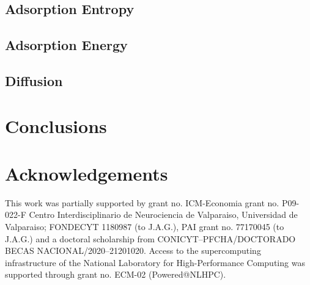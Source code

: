 \documentclass[twoside,twocolumn,9pt]{article}
\begin{document}
\subsection{Adsorption Entropy}

\subsection{Adsorption Energy}

\subsection{Diffusion}

\section{Conclusions}


\section*{Acknowledgements}
This work was partially supported by grant no. ICM-Economia grant
no. P09-022-F Centro Interdisciplinario de Neurociencia de Valparaiso,
Universidad de Valparaiso; FONDECYT 1180987 (to J.A.G.), PAI grant
no. 77170045 (to J.A.G.) and a doctoral scholarship from
CONICYT--PFCHA/DOCTORADO BECAS NACIONAL/2020--21201020.  Access to the
supercomputing infrastructure of the National Laboratory for
High-Performance Computing was supported through grant no. ECM-02
(Powered@NLHPC).




\end{document}
